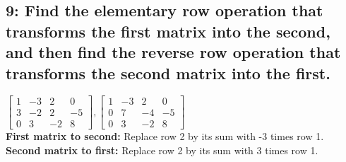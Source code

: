 \documentclass{article}
\begin{document}
\subsection*{9: Find the elementary row operation that transforms the first matrix into the second, and then find the reverse row operation that transforms the second matrix into the first.}
$\left[\begin{array}{ccc|c}
1 & -3 & 2 & 0 \\
3 & -2 & 2 & -5 \\ 
0 & 3 & -2 & 8 
\end{array}\right] ,
\left[\begin{array}{ccc|c}
    1 & -3 & 2 & 0 \\
    0 & 7 & -4 & -5 \\ 
    0 & 3 & -2 & 8 
    \end{array}\right] 
$
\\ \textbf{First matrix to second:}
Replace row 2 by its sum with -3 times row 1.
\\ \textbf{Second matrix to first:}
Replace row 2 by its sum with 3 times row 1.
\end{document}
